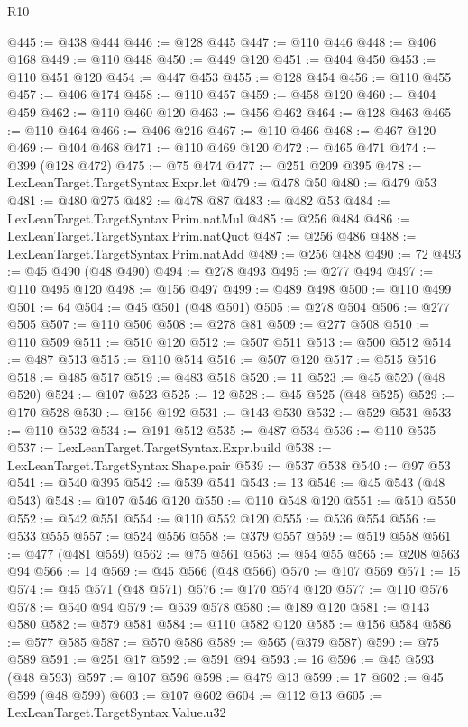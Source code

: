 \begin{lexlean}{R10}
\begin{coremodule}
@445 := @438 @444
@446 := @128 @445
@447 := @110 @446
@448 := @406 @168
@449 := @110 @448
@450 := @449 @120
@451 := @404 @450
@453 := @110 @451 @120
@454 := @447 @453
@455 := @128 @454
@456 := @110 @455
@457 := @406 @174
@458 := @110 @457
@459 := @458 @120
@460 := @404 @459
@462 := @110 @460 @120
@463 := @456 @462
@464 := @128 @463
@465 := @110 @464
@466 := @406 @216
@467 := @110 @466
@468 := @467 @120
@469 := @404 @468
@471 := @110 @469 @120
@472 := @465 @471
@474 := @399 (@128 @472)
@475 := @75 @474
@477 := @251 @209 @395
@478 := LexLeanTarget.TargetSyntax.Expr.let
@479 := @478 @50
@480 := @479 @53
@481 := @480 @275
@482 := @478 @87
@483 := @482 @53
@484 := LexLeanTarget.TargetSyntax.Prim.natMul
@485 := @256 @484
@486 := LexLeanTarget.TargetSyntax.Prim.natQuot
@487 := @256 @486
@488 := LexLeanTarget.TargetSyntax.Prim.natAdd
@489 := @256 @488
@490 := 72
@493 := @45 @490 (@48 @490)
@494 := @278 @493
@495 := @277 @494
@497 := @110 @495 @120
@498 := @156 @497
@499 := @489 @498
@500 := @110 @499
@501 := 64
@504 := @45 @501 (@48 @501)
@505 := @278 @504
@506 := @277 @505
@507 := @110 @506
@508 := @278 @81
@509 := @277 @508
@510 := @110 @509
@511 := @510 @120
@512 := @507 @511
@513 := @500 @512
@514 := @487 @513
@515 := @110 @514
@516 := @507 @120
@517 := @515 @516
@518 := @485 @517
@519 := @483 @518
@520 := 11
@523 := @45 @520 (@48 @520)
@524 := @107 @523
@525 := 12
@528 := @45 @525 (@48 @525)
@529 := @170 @528
@530 := @156 @192
@531 := @143 @530
@532 := @529 @531
@533 := @110 @532
@534 := @191 @512
@535 := @487 @534
@536 := @110 @535
@537 := LexLeanTarget.TargetSyntax.Expr.build
@538 := LexLeanTarget.TargetSyntax.Shape.pair
@539 := @537 @538
@540 := @97 @53
@541 := @540 @395
@542 := @539 @541
@543 := 13
@546 := @45 @543 (@48 @543)
@548 := @107 @546 @120
@550 := @110 @548 @120
@551 := @510 @550
@552 := @542 @551
@554 := @110 @552 @120
@555 := @536 @554
@556 := @533 @555
@557 := @524 @556
@558 := @379 @557
@559 := @519 @558
@561 := @477 (@481 @559)
@562 := @75 @561
@563 := @54 @55
@565 := @208 @563 @94
@566 := 14
@569 := @45 @566 (@48 @566)
@570 := @107 @569
@571 := 15
@574 := @45 @571 (@48 @571)
@576 := @170 @574 @120
@577 := @110 @576
@578 := @540 @94
@579 := @539 @578
@580 := @189 @120
@581 := @143 @580
@582 := @579 @581
@584 := @110 @582 @120
@585 := @156 @584
@586 := @577 @585
@587 := @570 @586
@589 := @565 (@379 @587)
@590 := @75 @589
@591 := @251 @17
@592 := @591 @94
@593 := 16
@596 := @45 @593 (@48 @593)
@597 := @107 @596
@598 := @479 @13
@599 := 17
@602 := @45 @599 (@48 @599)
@603 := @107 @602
@604 := @112 @13
@605 := LexLeanTarget.TargetSyntax.Value.u32

\end{coremodule}
\end{lexlean}
